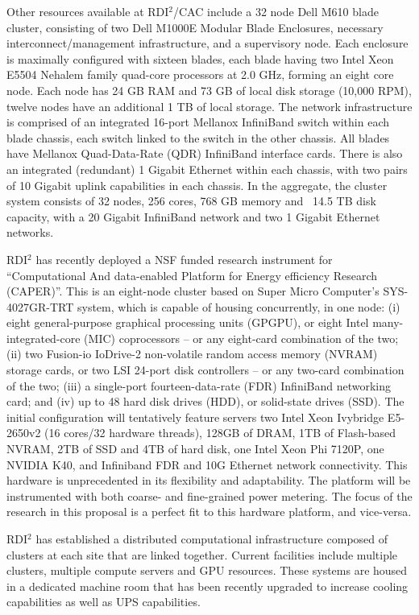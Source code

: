 Other resources available at RDI$^2$/CAC include a 32 node Dell M610 blade cluster, consisting of two Dell M1000E Modular Blade Enclosures, necessary interconnect/management infrastructure, and a supervisory node. Each enclosure is maximally configured with sixteen blades, each blade having two Intel Xeon E5504 Nehalem family quad-core processors at 2.0 GHz, forming an eight core node. Each node has 24 GB RAM and 73 GB of local disk storage (10,000 RPM), twelve nodes have an additional 1 TB of local storage. The network infrastructure is comprised of an integrated 16-port Mellanox InfiniBand switch within each blade chassis, each switch linked to the switch in the other chassis. All blades have Mellanox Quad-Data-Rate (QDR) InfiniBand interface cards. There is also an integrated (redundant) 1 Gigabit Ethernet within each chassis, with two pairs of 10 Gigabit uplink capabilities in each chassis. In the aggregate, the cluster system consists of 32 nodes, 256 cores, 768 GB memory and ~14.5 TB disk capacity, with a 20 Gigabit InfiniBand network and two 1 Gigabit Ethernet networks. 

RDI$^2$ has recently deployed a NSF funded research instrument for ``Computational And data-enabled Platform for Energy efficiency Research (CAPER)''. 
This is an eight-node cluster based on Super Micro Computer's SYS-4027GR-TRT system, which is capable of housing concurrently, in one node: (i) eight general-purpose graphical processing units (GPGPU), or eight Intel many-integrated-core (MIC) coprocessors -- or any eight-card combination of the two;(ii) two Fusion-io IoDrive-2 non-volatile random access memory (NVRAM) storage cards, or two LSI 24-port disk controllers -- or any two-card combination of the two; (iii) a single-port fourteen-data-rate (FDR) InfiniBand networking card; and (iv) up to 48 hard disk drives (HDD), or solid-state drives (SSD). The initial configuration will tentatively feature servers two Intel Xeon Ivybridge E5-2650v2 (16 cores/32 hardware threads), 128GB of DRAM, 1TB of Flash-based NVRAM, 2TB of SSD and 4TB of hard disk, one Intel Xeon Phi 7120P, one NVIDIA K40, and Infiniband FDR and 10G Ethernet network connectivity. This hardware is unprecedented in its flexibility and adaptability.  The platform will be instrumented with both coarse- and fine-grained power metering. The focus of the research in this proposal is a perfect fit to this hardware platform, and vice-versa.  

RDI$^2$ has established a distributed computational infrastructure composed of clusters at each site that are linked together. Current facilities include multiple clusters, multiple compute servers and GPU resources. These systems are housed in a dedicated machine room that has been recently upgraded to increase cooling capabilities as well as UPS capabilities. 

